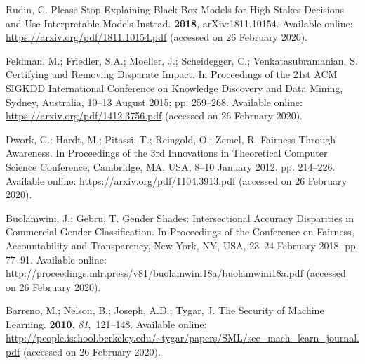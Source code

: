 \documentclass[information,article,accept,moreauthors,pdftex]{Definitions/mdpi}
\begin{document}
\begin{thebibliography}{999}
\providecommand{\natexlab}[1]{#1}

Rudin, C.
\newblock Please {S}top {E}xplaining {B}lack {B}ox {M}odels for {H}igh {S}takes
  {D}ecisions and {U}se {I}nterpretable {M}odels {I}nstead.
 {\bf 2018}, arXiv:1811.10154.
\newblock  Available online: \url{https://arxiv.org/pdf/1811.10154.pdf} (accessed on 26 February 2020).

Feldman, M.; Friedler, S.A.; Moeller, J.; Scheidegger, C.; Venkatasubramanian,
  S.
\newblock Certifying and {R}emoving {D}isparate {I}mpact.
\newblock In {Proceedings of the 21{st} ACM SIGKDD International
  Conference on Knowledge Discovery and Data Mining},  Sydney, Australia, 10--13 August 2015; pp. 259--268.
\newblock Available online: \url{https://arxiv.org/pdf/1412.3756.pdf} (accessed on 26 February 2020).  



Dwork, C.; Hardt, M.; Pitassi, T.; Reingold, O.; Zemel, R.
\newblock Fairness {T}hrough {A}wareness.
\newblock  In {Proceedings of the 3rd Innovations in Theoretical Computer Science
  Conference}, Cambridge, MA, USA, 8--10 January 2012. pp. 214--226. 
\newblock Available online: \url{https://arxiv.org/pdf/1104.3913.pdf} (accessed on 26 February 2020).

Buolamwini, J.; Gebru, T.
\newblock Gender {S}hades: {I}ntersectional {A}ccuracy {D}isparities in
  {C}ommercial {G}ender {C}lassification.
\newblock In Proceedings of the  Conference on Fairness, Accountability and {Transparency}, New York, NY, USA, 23--24 February 2018. pp. 77--91.
\newblock Available online: 
  \url{http://proceedings.mlr.press/v81/buolamwini18a/buolamwini18a.pdf} (accessed on 26 February 2020).

Barreno, M.; Nelson, B.; Joseph, A.D.; Tygar, J.
\newblock The {S}ecurity of {M}achine {L}earning.
 {\bf 2010}, {\em 81},~121--148.
\newblock Available online: 
  \url{http://people.ischool.berkeley.edu/~tygar/papers/SML/sec_mach_learn_journal.pdf} (accessed on 26 February 2020).


\end{thebibliography}
\end{document}
